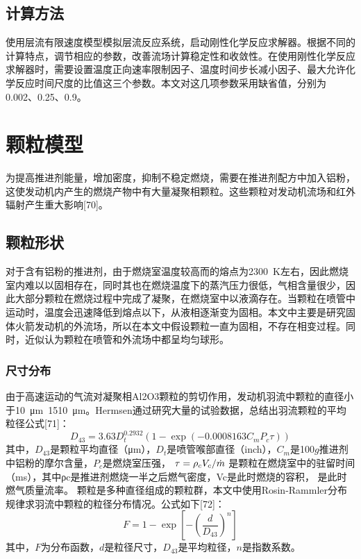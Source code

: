 \subsection{计算方法}
使用层流有限速度模型模拟层流反应系统，启动刚性化学反应求解器。根据不同的计算特点，调节相应的参数，改善流场计算稳定性和收敛性。在使用刚性化学反应求解器时，需要设置温度正向速率限制因子、温度时间步长减小因子、最大允许化学反应时间尺度的比值这三个参数。本文对这几项参数采用缺省值，分别为0.002、0.25、0.9。
\section{颗粒模型}
为提高推进剂能量，增加密度，抑制不稳定燃烧，需要在推进剂配方中加入铝粉，这使发动机内产生的燃烧产物中有大量凝聚相颗粒。这些颗粒对发动机流场和红外辐射产生重大影响[70]。
\subsection{颗粒形状}
对于含有铝粉的推进剂，由于燃烧室温度较高而的熔点为\SI[mode=text]{2300}{K}左右，因此燃烧室内难以以固相存在，同时其也在燃烧温度下的蒸汽压力很低，气相含量很少，因此大部分颗粒在燃烧过程中完成了凝聚，在燃烧室中以液滴存在。当颗粒在喷管中运动时，温度会迅速降低到熔点以下，从液相逐渐变为固相。本文中主要是研究固体火箭发动机的外流场，所以在本文中假设颗粒一直为固相，不存在相变过程。同时，近似认为颗粒在喷管和外流场中都呈均匀球形。
\subsubsection{尺寸分布}
由于高速运动的气流对凝聚相Al2O3颗粒的剪切作用，发动机羽流中颗粒的直径小于\SI{10}{\um}~15\SI{10}{\um}。Hermsen通过研究大量的试验数据，总结出羽流颗粒的平均粒径公式[71]：
\begin{equation}
{D_{43}} = 3.63D_t^{0.2932}\left( {1 - \exp \left( { - 0.0008163{C_m}{P_c}\tau } \right)} \right)
\end{equation}
其中，$D_{43}$是颗粒平均直径（\si{\um}），$D_t$是喷管喉部直径（inch），$C_m$是100$g$推进剂中铝粉的摩尔含量，$P_c$是燃烧室压强，  $\tau  = {{{\rho _c}{V_c}} \mathord{\left/
		{\vphantom {{{\rho _c}{V_c}} {\dot m}}} \right.
		\kern-\nulldelimiterspace} {\dot m}}$ 
是颗粒在燃烧室中的驻留时间（\si{\ms}），其中ρc是推进剂燃烧一半之后燃气密度，Vc是此时燃烧的容积， 是此时燃气质量流率。
颗粒是多种直径组成的颗粒群，本文中使用Rosin-Rammler分布规律求羽流中颗粒的粒径分布情况。公式如下[72]：
\begin{equation}
F = 1 - \exp \left[ { - {{\left( {\frac{d}{{{D_{43}}}}} \right)}^n}} \right]
\end{equation}
其中，$F$为分布函数，$d$是粒径尺寸，$D_{43}$是平均粒径，$n$是指数系数。
